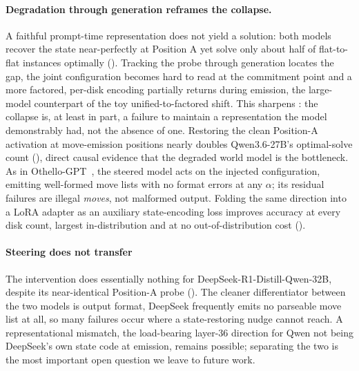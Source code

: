 \documentclass{article} %
\begin{document}
\paragraph{Degradation through generation reframes the collapse.}
A faithful prompt-time representation does not yield a solution: both models recover the state near-perfectly at Position A yet solve only about half of flat-to-flat instances optimally (). Tracking the probe through generation locates the gap, the joint configuration becomes hard to read at the commitment point and a more factored, per-disk encoding partially returns during emission, the large-model counterpart of the toy unified-to-factored shift. This sharpens \citet{shojaee2025illusion}: the collapse is, at least in part, a failure to maintain a representation the model demonstrably had, not the absence of one. Restoring the clean Position-A activation at move-emission positions nearly doubles Qwen3.6-27B's optimal-solve count (), direct causal evidence that the degraded world model is the bottleneck. As in Othello-GPT~\citep{li2022emergent}, the steered model acts on the injected configuration, emitting well-formed move lists with no format errors at any $\alpha$; its residual failures are illegal \emph{moves}, not malformed output. Folding the same direction into a LoRA adapter as an auxiliary state-encoding loss improves accuracy at every disk count, largest in-distribution and at no out-of-distribution cost ().

\paragraph{Steering does not transfer}
The intervention does essentially nothing for DeepSeek-R1-Distill-Qwen-32B, despite its near-identical Position-A probe (). The cleaner differentiator between the two models is output format, DeepSeek frequently emits no parseable move list at all, so many failures occur where a state-restoring nudge cannot reach. A representational mismatch, the load-bearing layer-36 direction for Qwen not being DeepSeek's own state code at emission, remains possible; separating the two is the most important open question we leave to future work.
\end{document}
